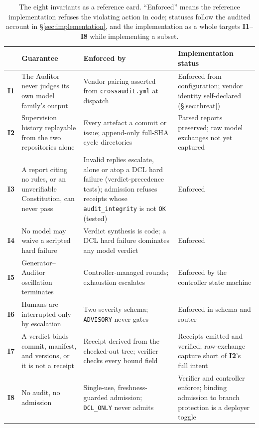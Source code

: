 \documentclass[11pt]{article}
\newcommand{\invariant}[1]{\textbf{I#1}}
\begin{document}
\begin{table}[t]
\centering
\footnotesize
\caption{The eight invariants as a reference card. ``Enforced'' means the reference implementation refuses the violating action in code; statuses follow the audited account in \S\ref{sec:implementation}, and the implementation as a whole targets \invariant{1}--\invariant{8} while implementing a subset.}
\label{tab:invariants}
\begin{tabular}{@{}l p{3.45cm} p{4.35cm} p{4.35cm}@{}}
\toprule
 & Guarantee & Enforced by & Implementation status \\
\midrule
\invariant{1} & The Auditor never judges its own model family's output & Vendor pairing asserted from \texttt{crossaudit.yml} at dispatch & Enforced from configuration; vendor identity self-declared (\S\ref{sec:threat}) \\
\invariant{2} & Supervision history replayable from the two repositories alone & Every artefact a commit or issue; append-only full-SHA cycle directories & Parsed reports preserved; raw model exchanges not yet captured \\
\invariant{3} & A report citing no rules, or an unverifiable Constitution, can never pass & Invalid replies escalate, alone or atop a DCL hard failure (verdict-precedence tests); admission refuses receipts whose \texttt{audit\_integrity} is not \texttt{OK} (tested) & Enforced \\
\invariant{4} & No model may waive a scripted hard failure & Verdict synthesis is code; a DCL hard failure dominates any model verdict & Enforced \\
\invariant{5} & Generator--Auditor oscillation terminates & Controller-managed rounds; exhaustion escalates & Enforced by the controller state machine \\
\invariant{6} & Humans are interrupted only by escalation & Two-severity schema; \texttt{ADVISORY} never gates & Enforced in schema and router \\
\invariant{7} & A verdict binds commit, manifest, and versions, or it is not a receipt & Receipt derived from the checked-out tree; verifier checks every bound field & Receipts emitted and verified; raw-exchange capture short of \invariant{2}'s full intent \\
\invariant{8} & No audit, no admission & Single-use, freshness-guarded admission; \texttt{DCL\_ONLY} never admits & Verifier and controller enforce; binding admission to branch protection is a deployer toggle \\
\bottomrule
\end{tabular}
\end{table}
\end{document}
